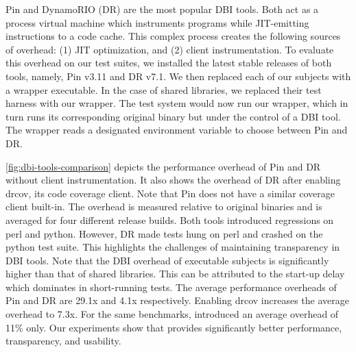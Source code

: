 Pin and DynamoRIO (DR) are the most popular DBI tools.
Both act as a process virtual machine which instruments programs while JIT-emitting instructions to a code cache.
This complex process creates the following sources of overhead: 
(1) JIT optimization, and (2) client instrumentation.
To evaluate this overhead on our test suites, we installed the latest stable releases of both tools, namely, Pin v3.11 and DR v7.1.
We then replaced each of our subjects with a wrapper executable.
In the case of shared libraries, we replaced their test harness with our wrapper.
The test system would now run our wrapper, which in turn runs its corresponding original binary but under the control of a DBI tool. 
The wrapper reads a designated environment variable to choose between Pin and DR.

\cref{fig:dbi-tools-comparison} depicts the performance overhead of Pin and DR without client instrumentation.
It also shows the overhead of DR after enabling \textsf{drcov}, its code coverage client.
Note that Pin does not have a similar coverage client built-in.
The overhead is measured relative to original binaries and is averaged for four different release builds.
Both tools introduced regressions on \textsf{perl} and \textsf{python}.
However, DR made tests hung on \textsf{perl} and crashed on the \textsf{python} test suite. 
This highlights the challenges of maintaining transparency in DBI tools. 
Note that the DBI overhead of executable subjects is significantly higher than that of shared libraries. 
This can be attributed to the start-up delay which dominates in short-running tests.
The average performance overheads of Pin and DR are 29.1x and 4.1x respectively.
Enabling \textsf{drcov} increases the average overhead to 7.3x.
For the same benchmarks, {\bcov} introduced an average overhead of 11\% only.
Our experiments show that {\bcov} provides significantly better performance, transparency, and usability. 


